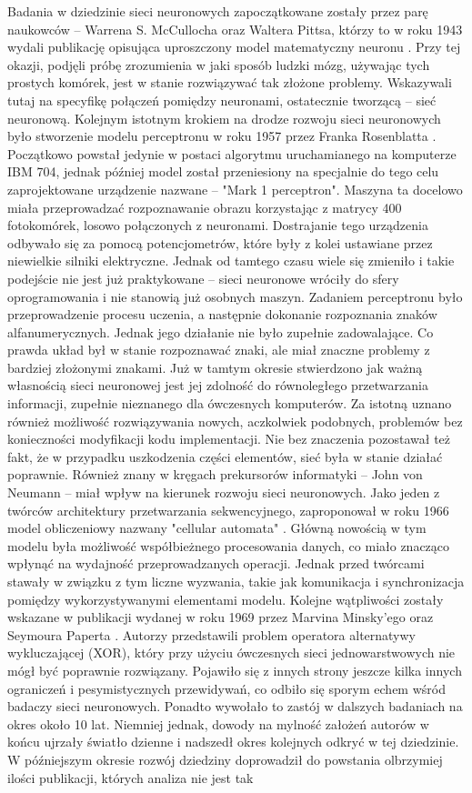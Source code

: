 Badania w dziedzinie sieci neuronowych zapoczątkowane zostały przez parę naukowców -- Warrena S. McCullocha oraz Waltera Pittsa, którzy to w roku 1943 wydali publikację opisująca uproszczony model matematyczny neuronu \cite{MaP43}. Przy tej okazji, podjęli próbę zrozumienia w jaki sposób ludzki mózg, używając tych prostych komórek, jest w stanie rozwiązywać tak złożone problemy. Wskazywali tutaj na specyfikę połączeń pomiędzy neuronami, ostatecznie tworzącą -- sieć neuronową.  Kolejnym istotnym krokiem na drodze rozwoju sieci neuronowych było stworzenie modelu perceptronu w roku 1957 przez Franka Rosenblatta \cite{Ros57}. Początkowo powstał jedynie w postaci algorytmu uruchamianego na komputerze IBM 704, jednak później model został przeniesiony na specjalnie do tego celu zaprojektowane urządzenie nazwane -- "Mark 1 perceptron". Maszyna ta docelowo miała przeprowadzać rozpoznawanie obrazu korzystając z matrycy 400 fotokomórek, losowo połączonych z neuronami. Dostrajanie tego urządzenia odbywało się za pomocą potencjometrów, które były z kolei ustawiane przez niewielkie silniki elektryczne. Jednak od tamtego czasu wiele się zmieniło i takie podejście nie jest już praktykowane -- sieci neuronowe wróciły do sfery oprogramowania i nie stanowią już osobnych maszyn. Zadaniem perceptronu było przeprowadzenie procesu uczenia, a następnie dokonanie rozpoznania znaków alfanumerycznych. Jednak jego działanie nie było zupełnie zadowalające. Co prawda układ był w stanie rozpoznawać znaki, ale miał znaczne problemy z bardziej złożonymi znakami. Już w tamtym okresie stwierdzono jak ważną własnością sieci neuronowej jest jej zdolność do równoległego przetwarzania informacji, zupełnie nieznanego dla ówczesnych komputerów. Za istotną uznano również możliwość rozwiązywania nowych, aczkolwiek podobnych, problemów bez konieczności modyfikacji kodu implementacji. Nie bez znaczenia pozostawał też fakt, że w przypadku uszkodzenia części elementów, sieć była w stanie działać poprawnie. Również znany w kręgach prekursorów informatyki -- John von Neumann -- miał wpływ na kierunek rozwoju sieci neuronowych. Jako jeden z twórców architektury przetwarzania sekwencyjnego, zaproponował w roku 1966 model obliczeniowy nazwany "cellular automata" \cite{NaB66}. Główną nowością w tym modelu była możliwość współbieżnego procesowania danych, co miało znacząco wpłynąć na wydajność przeprowadzanych operacji. Jednak przed twórcami stawały w związku z tym liczne wyzwania, takie jak komunikacja i synchronizacja pomiędzy wykorzystywanymi elementami modelu. Kolejne wątpliwości zostały wskazane w publikacji wydanej w roku 1969 przez Marvina Minsky'ego oraz Seymoura Paperta \cite{MaP69}. Autorzy przedstawili problem operatora alternatywy wykluczającej (XOR), który przy użyciu ówczesnych sieci jednowarstwowych nie mógł być poprawnie rozwiązany. Pojawiło się z innych strony jeszcze kilka innych ograniczeń i pesymistycznych przewidywań, co odbiło się sporym echem wśród badaczy sieci neuronowych. Ponadto wywołało to zastój w dalszych badaniach na okres około 10 lat. Niemniej jednak, dowody na mylność założeń autorów w końcu ujrzały światło dzienne i nadszedł okres kolejnych odkryć w tej dziedzinie. W późniejszym okresie rozwój dziedziny doprowadził do powstania olbrzymiej ilości publikacji, których analiza nie jest tak 